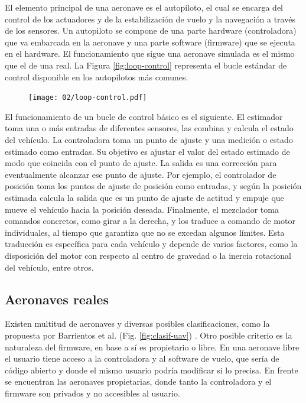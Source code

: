 \documentclass[../main.tex]{subfiles}
\begin{document}
El elemento principal de una aeronave es el autopiloto, el cual se encarga del control de los actuadores y de la estabilización de vuelo y la navegación a través de los sensores. Un autopiloto se compone de una parte hardware (controladora) que va embarcada en la aeronave y una parte software (firmware) que se ejecuta en el hardware.
El funcionamiento que sigue una aeronave simulada es el mismo que el de una real. La Figura \ref{fig:loop-control} representa el bucle estándar de control disponible en los autopilotos más comunes.

\begin{figure}[ht]
 	{\texttt{[image: 02/loop-control.pdf]}}
\end{figure}

El funcionamiento de un bucle de control básico es el siguiente. El estimador toma una o más entradas de diferentes sensores, las combina y calcula el estado del vehículo. La controladora toma un punto de ajuste y una medición o estado estimado como entradas. Su objetivo es ajustar el valor del estado estimado de modo que coincida con el punto de ajuste. La salida es una corrección para eventualmente alcanzar ese punto de ajuste. Por ejemplo, el controlador de posición toma los puntos de ajuste de posición como entradas, y según la posición estimada calcula la salida que es un punto de ajuste de actitud y empuje que mueve el vehículo hacia la posición deseada. Finalmente, el mezclador toma comandos concretos, como girar a la derecha, y los traduce a comando de motor individuales, al tiempo que garantiza que no se excedan algunos límites. Esta traducción es específica para cada vehículo y depende de varios factores, como la disposición del motor con respecto al centro de gravedad o la inercia rotacional del vehículo, entre otros.

\subsection{Aeronaves reales} \label{section:herram-reales}
Existen multitud de aeronaves y diversas posibles clasificaciones, como la propuesta por Barrientos et al. (Fig. \ref{fig:clasif-uav}) \cite{barrientos2007vehiculos}. Otro posible criterio es la naturaleza del firmware, en base a sí es propietario o libre. En una aeronave libre el usuario tiene acceso a la controladora y al software de vuelo, que sería de código abierto y donde el mismo usuario podría modificar si lo precisa. En frente se encuentran las aeronaves propietarias, donde tanto la controladora y el firmware son privados y no accesibles al usuario. \\
\end{document}
